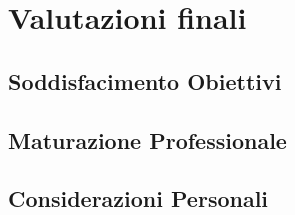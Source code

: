 
\chapter{Valutazioni finali}
\label{cap:analisi-requisiti}
\section{Soddisfacimento Obiettivi}
\section{Maturazione Professionale}
\section{Considerazioni Personali}